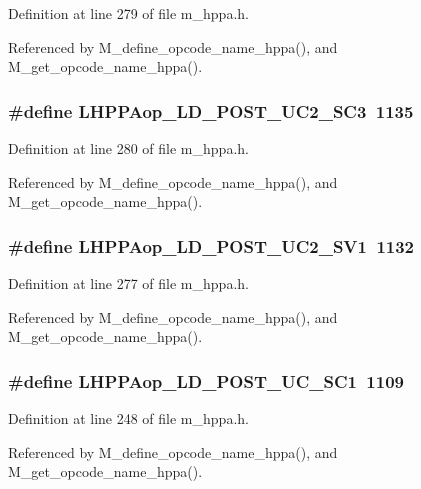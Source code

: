 Definition at line 279 of file m\_\-hppa.h.

Referenced by M\_\-define\_\-opcode\_\-name\_\-hppa(), and M\_\-get\_\-opcode\_\-name\_\-hppa().
\subsubsection{\setlength{\rightskip}{0pt plus 5cm}\#define LHPPAop\_\-LD\_\-POST\_\-UC2\_\-SC3~1135}\label{m__hppa_8h_c0f16ea6d087c535dc97281e3839fe0a}




Definition at line 280 of file m\_\-hppa.h.

Referenced by M\_\-define\_\-opcode\_\-name\_\-hppa(), and M\_\-get\_\-opcode\_\-name\_\-hppa().
\subsubsection{\setlength{\rightskip}{0pt plus 5cm}\#define LHPPAop\_\-LD\_\-POST\_\-UC2\_\-SV1~1132}\label{m__hppa_8h_0cf0c515bf089e0920a7bfe782738206}




Definition at line 277 of file m\_\-hppa.h.

Referenced by M\_\-define\_\-opcode\_\-name\_\-hppa(), and M\_\-get\_\-opcode\_\-name\_\-hppa().
\subsubsection{\setlength{\rightskip}{0pt plus 5cm}\#define LHPPAop\_\-LD\_\-POST\_\-UC\_\-SC1~1109}\label{m__hppa_8h_02d65ce0945a856aa5b5d169b7d7a82c}




Definition at line 248 of file m\_\-hppa.h.

Referenced by M\_\-define\_\-opcode\_\-name\_\-hppa(), and M\_\-get\_\-opcode\_\-name\_\-hppa().
